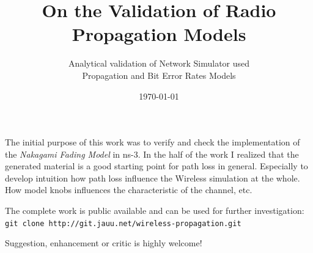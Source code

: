 \documentclass[9pt]{article}
\begin{document}
\title{On the Validation of Radio Propagation Models}

\subtitle{Analytical validation of Network Simulator used\\Propagation and Bit Error Rates Models}

\date{\today}
\maketitle

\begin{slide}
\bi
	\item The initial purpose of this work was to verify and
	      check the implementation of the \textit{Nakagami Fading Model}
		  in ns-3. In the half of the work I realized that the generated
		  material is a good starting point for path loss in general.
		  Especially to develop intuition how path loss influence the Wireless
		  simulation at the whole. How model knobs influences the
		  characteristic of the channel, etc.

	\item The complete work is public available and can be used for further
	      investigation:\newline
	      \verb+git clone http://git.jauu.net/wireless-propagation.git+

	\item Suggestion, enhancement or critic is highly welcome!
\ei
\end{slide}
\end{document}
